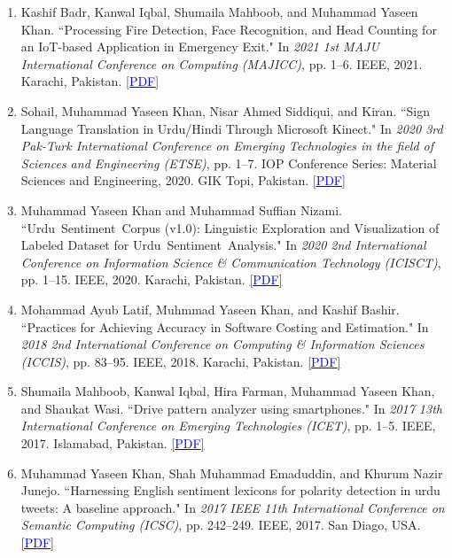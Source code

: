 \documentclass[10pt]{article}
\begin{document}
\begin{enumerate}
\item Kashif Badr, Kanwal Iqbal, Shumaila Mahboob, and Muhammad Yaseen Khan. ``Processing Fire Detection, Face Recognition, and Head Counting for an IoT-based Application in Emergency Exit." In \emph{2021 1st MAJU International Conference on Computing (MAJICC)}, pp. 1--6. IEEE, 2021. Karachi, Pakistan. \href{https://ieeexplore.ieee.org/document/9526261}{\scshape\small [\textcolor{blue}{PDF}]}

\item Sohail, Muhammad Yaseen Khan, Nisar Ahmed Siddiqui, and Kiran. ``Sign Language Translation in Urdu/Hindi Through Microsoft Kinect." In \emph{2020 3rd Pak-Turk International Conference on Emerging Technologies in the field of Sciences and Engineering (ETSE)}, pp. 1--7. IOP Conference Series: Material Sciences and Engineering, 2020. GIK Topi, Pakistan. \href{https://doi.org/10.1109/ICISCT49550.2020.9080043}{\scshape\small [\textcolor{blue}{PDF}]}

\item Muhammad Yaseen Khan and Muhammad Suffian Nizami. ``Urdu~Sentiment~Corpus (v1.0): Linguistic Exploration and Visualization of Labeled Dataset for Urdu~Sentiment~Analysis." In \emph{2020 2nd International Conference on Information Science \& Communication Technology (ICISCT)}, pp. 1--15. IEEE, 2020. Karachi, Pakistan. \href{https://doi.org/10.1109/ICISCT49550.2020.9080043}{\scshape\small [\textcolor{blue}{PDF}]}


\item Mohammad Ayub Latif, Muhmmad Yaseen Khan, and Kashif Bashir. ``Practices for Achieving Accuracy in Software Costing and Estimation." In \emph{2018 2nd International Conference on Computing \& Information Sciences (ICCIS)}, pp. 83--95. IEEE, 2018. Karachi, Pakistan. \href{http://kjcis.pafkiet.edu.pk/index.php/kjcis/article/view/13}{\scshape\small [\textcolor{blue}{PDF}]}

\item Shumaila Mahboob, Kanwal Iqbal, Hira Farman, Muhammad Yaseen Khan, and Shaukat Wasi. ``Drive pattern analyzer using smartphones." In \emph{2017 13th International Conference on Emerging Technologies (ICET)}, pp. 1--5. IEEE, 2017. Islamabad, Pakistan. \href{https://doi.org/10.1109/ICET.2017.8281659}{\scshape\small [\textcolor{blue}{PDF}]}

\item Muhammad Yaseen Khan, Shah Muhammad Emaduddin, and Khurum Nazir Junejo. ``Harnessing English sentiment lexicons for polarity detection in urdu tweets: A baseline approach." In \emph{2017 IEEE 11th International Conference on Semantic Computing (ICSC)}, pp. 242--249. IEEE, 2017. San Diago, USA. \href{https://doi.org/10.1109/ICSC.2017.68}{\scshape\small [\textcolor{blue}{PDF}]}

\end{enumerate}
\end{document}
